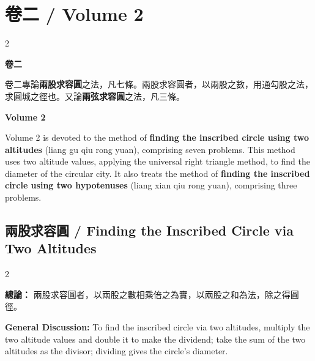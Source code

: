 \documentclass[11pt,a4paper]{article}
\newcounter{problem}[section]
\begin{document}
\section{卷二 / Volume 2}

\begin{paracol}{2}

\noindent\textbf{卷二}

\smallskip

卷二專論\textbf{兩股求容圓}之法，凡七條。兩股求容圓者，以兩股之數，用通勾股之法，求圓城之徑也。又論\textbf{兩弦求容圓}之法，凡三條。

\switchcolumn

\noindent\textbf{Volume 2}

\smallskip

Volume 2 is devoted to the method of \textbf{finding the inscribed circle using two altitudes} (liang gu qiu rong yuan), comprising seven problems. This method uses two altitude values, applying the universal right triangle method, to find the diameter of the circular city. It also treats the method of \textbf{finding the inscribed circle using two hypotenuses} (liang xian qiu rong yuan), comprising three problems.

\end{paracol}

\bigskip

\subsection*{兩股求容圓 / Finding the Inscribed Circle via Two Altitudes}

\begin{paracol}{2}

\noindent\textbf{總論：} 兩股求容圓者，以兩股之數相乘倍之為實，以兩股之和為法，除之得圓徑。

\switchcolumn

\noindent\textbf{General Discussion:} To find the inscribed circle via two altitudes, multiply the two altitude values and double it to make the dividend; take the sum of the two altitudes as the divisor; dividing gives the circle's diameter.

\end{paracol}
\end{document}
